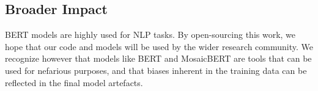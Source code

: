 \subsection{Broader Impact}

BERT models are highly used for NLP tasks. By open-sourcing this work, we hope that our code and models will be used by the wider research community. We recognize however that models like BERT and MosaicBERT are tools that can be used for nefarious purposes, and that biases inherent in the training data can be reflected in the final model artefacts. 

















